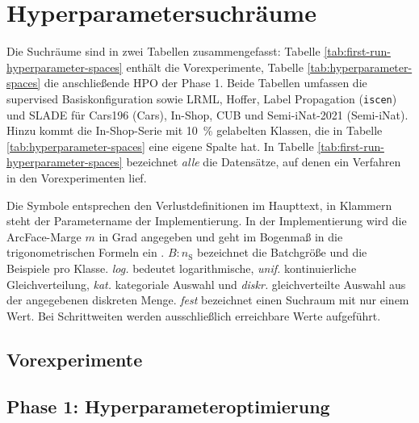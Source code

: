 \chapter{Hyperparametersuchräume}
\label{chap:anhang:suchraeume}

Die Suchräume sind in zwei Tabellen zusammengefasst: Tabelle \ref{tab:first-run-hyperparameter-spaces} enthält die Vorexperimente, Tabelle \ref{tab:hyperparameter-spaces} die anschließende \acs{HPO} der Phase 1. Beide Tabellen umfassen die supervised Basiskonfiguration sowie \ac{LRML}, Hoffer, Label Propagation (\texttt{iscen}) und \ac{SLADE} für Cars196 (Cars), In-Shop, \ac{CUB} und Semi-iNat-2021 (Semi-iNat). Hinzu kommt die In-Shop-Serie mit \qty{10}{\percent} gelabelten Klassen, die in Tabelle \ref{tab:hyperparameter-spaces} eine eigene Spalte hat. In Tabelle \ref{tab:first-run-hyperparameter-spaces} bezeichnet \emph{alle} die Datensätze, auf denen ein Verfahren in den Vorexperimenten lief. 

Die Symbole entsprechen den Verlustdefinitionen im Haupttext, in Klammern steht der Parametername der Implementierung. In der Implementierung wird die ArcFace-Marge $m$ in Grad angegeben und geht im Bogenmaß in die trigonometrischen Formeln ein \cite{musgrave_pytorch_2020}. $B{:}n_{\mathrm{S}}$ bezeichnet die Batchgröße und die Beispiele pro Klasse. \emph{log.} bedeutet logarithmische, \emph{unif.} kontinuierliche Gleichverteilung, \emph{kat.} kategoriale Auswahl und \emph{diskr.} gleichverteilte Auswahl aus der angegebenen diskreten Menge. \emph{fest} bezeichnet einen Suchraum mit nur einem Wert. Bei Schrittweiten werden ausschließlich erreichbare Werte aufgeführt.

\section{Vorexperimente}
\label{sec:anhang:phase0}







\section{Phase 1: Hyperparameteroptimierung}
\label{sec:anhang:phase1}

